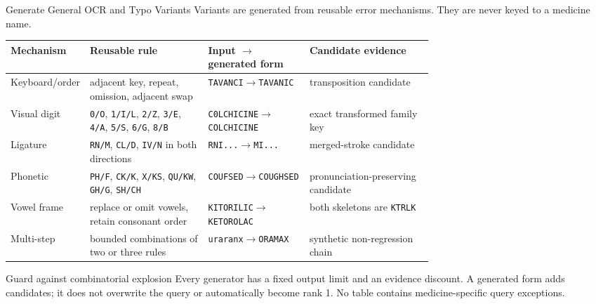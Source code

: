 \documentclass[aspectratio=169,10pt]{beamer}
\newcommand{\code}[1]{\texttt{#1}}
\begin{document}
\begin{frame}{Generate General OCR and Typo Variants}
\scriptsize
Variants are generated from reusable error mechanisms. They are never keyed to
a medicine name.

\begin{tabularx}{\linewidth}{@{}L{0.18\linewidth}L{0.28\linewidth}L{0.24\linewidth}Y@{}}
\toprule
\textbf{Mechanism} & \textbf{Reusable rule} & \textbf{Input $\rightarrow$ generated form} & \textbf{Candidate evidence} \\
\midrule
Keyboard/order & adjacent key, repeat, omission, adjacent swap & \code{TAVANCI}$\rightarrow$\code{TAVANIC} & transposition candidate \\
Visual digit & \code{0/O}, \code{1/I/L}, \code{2/Z}, \code{3/E}, \code{4/A}, \code{5/S}, \code{6/G}, \code{8/B} & \code{C0LCHICINE}$\rightarrow$\code{COLCHICINE} & exact transformed family key \\
Ligature & \code{RN/M}, \code{CL/D}, \code{IV/N} in both directions & \code{RNI...}$\rightarrow$\code{MI...} & merged-stroke candidate \\
Phonetic & \code{PH/F}, \code{CK/K}, \code{X/KS}, \code{QU/KW}, \code{GH/G}, \code{SH/CH} & \code{COUFSED}$\rightarrow$\code{COUGHSED} & pronunciation-preserving candidate \\
Vowel frame & replace or omit vowels, retain consonant order & \code{KITORILIC}$\rightarrow$\code{KETOROLAC} & both skeletons are \code{KTRLK} \\
Multi-step & bounded combinations of two or three rules & \code{uraranx}$\rightarrow$\code{ORAMAX} & synthetic non-regression chain \\
\bottomrule
\end{tabularx}

\vspace{2mm}
\begin{alertblock}{Guard against combinatorial explosion}
\scriptsize
Every generator has a fixed output limit and an evidence discount. A generated
form adds candidates; it does not overwrite the query or automatically become
rank 1. No table contains medicine-specific query exceptions.
\end{alertblock}
\end{frame}
\end{document}
